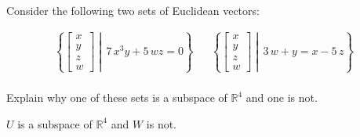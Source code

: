 
\begin{exerciseStatement}


Consider the following two sets of Euclidean vectors: 


\begin{align*}  \left\{ \left[\begin{array}{c}
x \\
y \\
z \\
w
\end{array}\right] \middle|\,7 \, x^{3} y + 5 \, w z = 0\right\}  & &   \left\{ \left[\begin{array}{c}
x \\
y \\
z \\
w
\end{array}\right] \middle|\,3 \, w + y = x - 5 \, z\right\}  \\ \end{align*}
            

 Explain why one of these sets is a subspace of \(\mathbb{R}^ 4 \) and one is not. 


\end{exerciseStatement}
    
\begin{exerciseAnswer} 


\(U\) is a subspace of \(\mathbb{R}^ 4 \) and \(W\) is not.


\end{exerciseAnswer}
    
